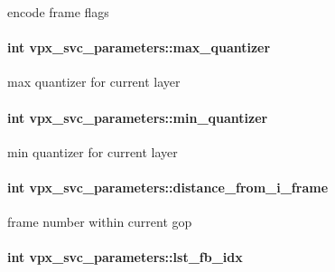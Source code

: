 encode frame flags \hypertarget{structvpx__svc__parameters_ac890a24e3ea26902f8d19552f8b7f3c7}{
\paragraph[{max\+\_\+quantizer}]{\setlength{\rightskip}{0pt plus 5cm}int vpx\+\_\+svc\+\_\+parameters\+::max\+\_\+quantizer}}\label{structvpx__svc__parameters_ac890a24e3ea26902f8d19552f8b7f3c7}
max quantizer for current layer \hypertarget{structvpx__svc__parameters_a4073b4749d687f969d6b23826d9ccefd}{
\paragraph[{min\+\_\+quantizer}]{\setlength{\rightskip}{0pt plus 5cm}int vpx\+\_\+svc\+\_\+parameters\+::min\+\_\+quantizer}}\label{structvpx__svc__parameters_a4073b4749d687f969d6b23826d9ccefd}
min quantizer for current layer \hypertarget{structvpx__svc__parameters_a0b04ebc9edfc8df09a1b9f65ba2d2ef6}{
\paragraph[{distance\+\_\+from\+\_\+i\+\_\+frame}]{\setlength{\rightskip}{0pt plus 5cm}int vpx\+\_\+svc\+\_\+parameters\+::distance\+\_\+from\+\_\+i\+\_\+frame}}\label{structvpx__svc__parameters_a0b04ebc9edfc8df09a1b9f65ba2d2ef6}
frame number within current gop \hypertarget{structvpx__svc__parameters_a75d36a52bb1d3a001c668cd577ea7f8b}{
\paragraph[{lst\+\_\+fb\+\_\+idx}]{\setlength{\rightskip}{0pt plus 5cm}int vpx\+\_\+svc\+\_\+parameters\+::lst\+\_\+fb\+\_\+idx}}\label{structvpx__svc__parameters_a75d36a52bb1d3a001c668cd577ea7f8b}
